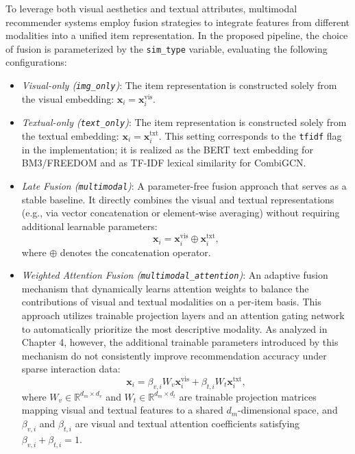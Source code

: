 To leverage both visual aesthetics and textual attributes, multimodal recommender systems employ fusion strategies to integrate features from different modalities into a unified item representation. In the proposed pipeline, the choice of fusion is parameterized by the \texttt{sim\_type} variable, evaluating the following configurations:
\begin{itemize}
    \item \textit{Visual-only (\texttt{img\_only})}: The item representation is constructed solely from the visual embedding: \(\mathbf{x}_i = \mathbf{x}_i^{\text{vis}}\).
    \item \textit{Textual-only (\texttt{text\_only})}: The item representation is constructed solely from the textual embedding: \(\mathbf{x}_i = \mathbf{x}_i^{\text{txt}}\). This setting corresponds to the \texttt{tfidf} flag in the implementation; it is realized as the BERT text embedding for BM3/FREEDOM and as TF-IDF lexical similarity for CombiGCN.
    \item \textit{Late Fusion (\texttt{multimodal})}: A parameter-free fusion approach that serves as a stable baseline. It directly combines the visual and textual representations (e.g., via vector concatenation or element-wise averaging) without requiring additional learnable parameters:
    \begin{equation}
        \mathbf{x}_i = \mathbf{x}_i^{\text{vis}} \oplus \mathbf{x}_i^{\text{txt}},
    \end{equation}
    where \(\oplus\) denotes the concatenation operator.
    \item \textit{Weighted Attention Fusion (\texttt{multimodal\_attention})}: An adaptive fusion mechanism that dynamically learns attention weights to balance the contributions of visual and textual modalities on a per-item basis. This approach utilizes trainable projection layers and an attention gating network to automatically prioritize the most descriptive modality. As analyzed in Chapter 4, however, the additional trainable parameters introduced by this mechanism do not consistently improve recommendation accuracy under sparse interaction data:
    \begin{equation}
        \mathbf{x}_i = \beta_{v,i} W_v \mathbf{x}_i^{\text{vis}} + \beta_{t,i} W_t \mathbf{x}_i^{\text{txt}},
    \end{equation}
    where \(W_v \in \mathbb{R}^{d_m \times d_v}\) and \(W_t \in \mathbb{R}^{d_m \times d_t}\) are trainable projection matrices mapping visual and textual features to a shared \(d_m\)-dimensional space, and \(\beta_{v,i}\) and \(\beta_{t,i}\) are visual and textual attention coefficients satisfying \(\beta_{v,i} + \beta_{t,i} = 1\).
\end{itemize}

